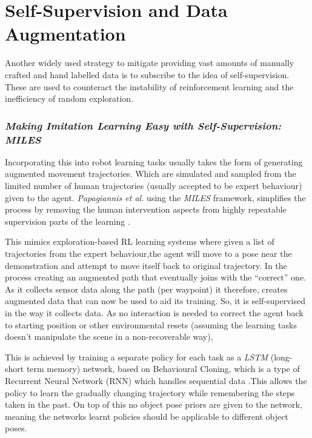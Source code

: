 \section{Self-Supervision and Data Augmentation}
Another widely used strategy to mitigate providing vast amounts of manually crafted and hand labelled data is to subscribe to the idea of self-supervision. These are used to counteract the instability of reinforcement learning and the inefficiency of random exploration.

\subsubsection{\emph{Making Imitation Learning Easy with Self-Supervision: MILES}}
Incorporating this into robot learning tasks usually takes the form of generating augmented movement trajectories. Which are simulated and sampled from the limited number of human trajectories (usually accepted to be expert behaviour) given to the agent. \emph{Papagiannis et al.} using the \emph{MILES} framework, simplifies the process by removing the human intervention aspects from highly repeatable supervision parts of the learning \cite{papagiannis2024milesmakingimitationlearning}. 

This mimics exploration-based RL learning systems where given a list of trajectories from the expert behaviour,the agent will move to a pose near the demonstration and attempt to move itself back to original trajectory. In the process creating an augmented path that eventually joins with the ``correct'' one. As it collects sensor data along the path (per waypoint) it therefore, creates augmented data that can now be used to aid its training. So, it is self-supervised in the way it collects data. As no interaction is needed to correct the agent back to starting position or other environmental resets (assuming the learning tasks doesn't manipulate the scene in a non-recoverable way),

This is achieved by training a separate policy for each task as a \emph{LSTM} (long-short term memory) network, based on Behavioural Cloning, which is a type of Recurrent Neural Network (RNN) which handles sequential data \cite{medsker2001recurrent}.This allows the policy to learn the gradually changing trajectory while remembering the steps taken in the past. On top of this no object pose priors are given to the network, meaning the networks learnt policies should be applicable to different object poses.

